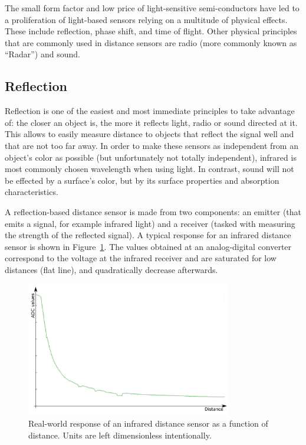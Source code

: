 
The small form factor and low price of light-sensitive semi-conductors have led to a proliferation of light-based sensors relying on a multitude of physical effects. These include reflection, phase shift, and time of flight. Other physical principles that are commonly used in distance sensors are radio (more commonly known as ``Radar'') and sound.   

\subsection{Reflection}
Reflection is one of the easiest and most immediate principles to take advantage of: the closer an object is, the more it reflects light, radio or sound directed at it. This allows to easily measure distance to objects that reflect the signal well and that are not too far away. In order to make these sensors as independent from an object's color as possible (but unfortunately not totally independent), infrared is most commonly chosen wavelength when using light. In contrast, sound will not be effected by a surface's color, but by its surface properties and absorption characteristics. 

A reflection-based distance sensor is made from two components: an emitter (that emits a signal, for example infrared light) and a receiver (tasked with measuring the strength of the reflected signal). A typical response for an infrared distance sensor is shown in Figure~\ref{fig:epuckir}. The values obtained at an analog-digital converter correspond to the voltage at the infrared receiver and are saturated for low distances (flat line), and quadratically decrease afterwards.


\begin{figure}
	\centering
		\includegraphics[width=0.8\textwidth]{figs/epuckirsensor.png}
	\caption{Real-world response of an infrared distance sensor as a function of distance. Units are left dimensionless intentionally.}
	\label{fig:epuckir}
\end{figure}

